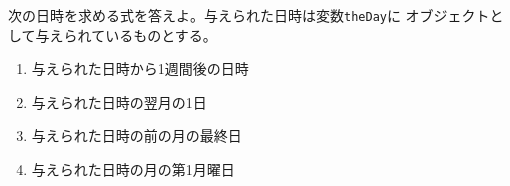 \begin{Prob}\upshape\label{DateProb}
 次の日時を求める式を答えよ。与えられた日時は変数\texttt{theDay}に
 オブジェクトとして与えられているものとする。
 \begin{enumerate}
	\item 与えられた日時から1週間後の日時
	\item 与えられた日時の翌月の1日
	\item 与えられた日時の前の月の最終日
	\item 与えられた日時の月の第1月曜日
 \end{enumerate}
\end{Prob}

